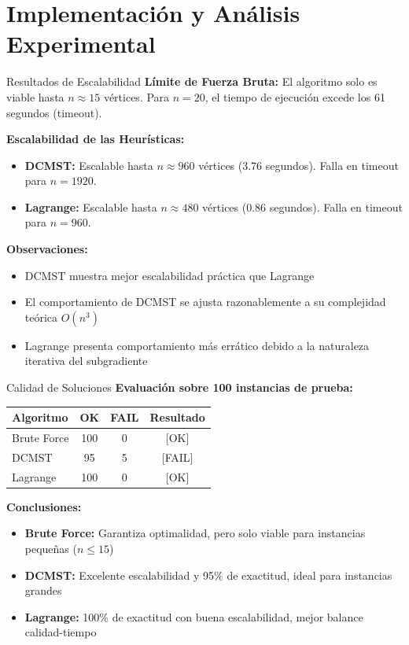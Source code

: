 \documentclass{beamer}
\begin{document}
\section{Implementación y Análisis Experimental}
\begin{frame}{Resultados de Escalabilidad}
\textbf{Límite de Fuerza Bruta:} El algoritmo solo es viable hasta $n \approx 15$ vértices. Para $n=20$, el tiempo de ejecución excede los 61 segundos (timeout).

\vspace{0.3cm}
\textbf{Escalabilidad de las Heurísticas:}
\begin{itemize}
  \item \textbf{DCMST:} Escalable hasta $n \approx 960$ vértices (3.76 segundos). Falla en timeout para $n=1920$.
  \item \textbf{Lagrange:} Escalable hasta $n \approx 480$ vértices (0.86 segundos). Falla en timeout para $n=960$.
\end{itemize}

\vspace{0.3cm}
\textbf{Observaciones:}
\begin{itemize}
  \item DCMST muestra mejor escalabilidad práctica que Lagrange
  \item El comportamiento de DCMST se ajusta razonablemente a su complejidad teórica $O(n^3)$
  \item Lagrange presenta comportamiento más errático debido a la naturaleza iterativa del subgradiente
\end{itemize}
\end{frame}

\begin{frame}{Calidad de Soluciones}
\textbf{Evaluación sobre 100 instancias de prueba:}

\vspace{0.3cm}
\begin{table}
\centering
\begin{tabular}{|l|c|c|c|}
\hline
\textbf{Algoritmo} & \textbf{OK} & \textbf{FAIL} & \textbf{Resultado} \\
\hline
Brute Force & 100 & 0 & [OK] \\
DCMST & 95 & 5 & [FAIL] \\
Lagrange & 100 & 0 & [OK] \\
\hline
\end{tabular}
\end{table}

\vspace{0.3cm}
\textbf{Conclusiones:}
\begin{itemize}
  \item \textbf{Brute Force:} Garantiza optimalidad, pero solo viable para instancias pequeñas ($n \leq 15$)
  \item \textbf{DCMST:} Excelente escalabilidad y 95\% de exactitud, ideal para instancias grandes
  \item \textbf{Lagrange:} 100\% de exactitud con buena escalabilidad, mejor balance calidad-tiempo
\end{itemize}
\end{frame}
\end{document}
